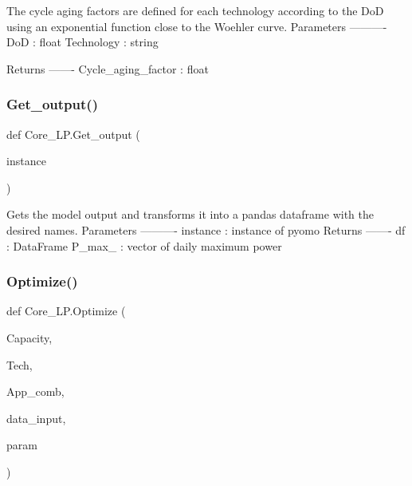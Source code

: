 \begin{DoxyVerb}The cycle aging factors are defined for each technology according
to the DoD using an exponential function close to the Woehler curve.
Parameters
----------
DoD : float
Technology : string

Returns
-------
Cycle_aging_factor : float
\end{DoxyVerb}
 \mbox{\label{namespace_core___l_p_a6d35392ffd5384b704752a0442ad2332}} 
\subsubsection{\texorpdfstring{Get\+\_\+output()}{Get\_output()}}
{\footnotesize\ttfamily def Core\+\_\+\+L\+P.\+Get\+\_\+output (\begin{DoxyParamCaption}\item[{}]{instance }\end{DoxyParamCaption})}

\begin{DoxyVerb}Gets the model output and transforms it into a pandas dataframe
with the desired names.
Parameters
----------
instance : instance of pyomo
Returns
-------
df : DataFrame
P_max_ : vector of daily maximum power
\end{DoxyVerb}
 \mbox{\label{namespace_core___l_p_a768caa5498af6ac8dbc012a3198f704b}} 
\subsubsection{\texorpdfstring{Optimize()}{Optimize()}}
{\footnotesize\ttfamily def Core\+\_\+\+L\+P.\+Optimize (\begin{DoxyParamCaption}\item[{}]{Capacity,  }\item[{}]{Tech,  }\item[{}]{App\+\_\+comb,  }\item[{}]{data\+\_\+input,  }\item[{}]{param }\end{DoxyParamCaption})}

